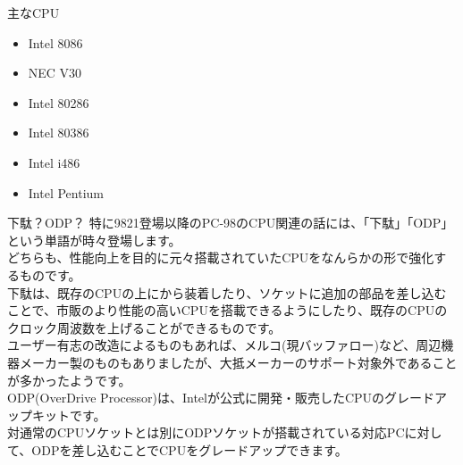 \documentclass[b5paper,9pt,platex,dvipdfmx]{jsarticle}
\begin{document}
\begin{multicols}{3}
\begin{enumerate}
\begin{itembox}[l]{主なCPU}
  \begin{itemize}
    \item Intel 8086
    \item NEC V30
    \item Intel 80286
    \item Intel 80386
    \item Intel i486
    \item Intel Pentium
  \end{itemize}
\end{itembox}
\begin{itembox}[l]{下駄？ODP？}
特に9821登場以降のPC-98のCPU関連の話には、「下駄」「ODP」という単語が時々登場します。\\
どちらも、性能向上を目的に元々搭載されていたCPUをなんらかの形で強化するものです。\\
下駄は、既存のCPUの上にから装着したり、ソケットに追加の部品を差し込むことで、市販のより性能の高いCPUを搭載できるようにしたり、既存のCPUのクロック周波数を上げることができるものです。\\
ユーザー有志の改造によるものもあれば、メルコ(現バッファロー)など、周辺機器メーカー製のものもありましたが、大抵メーカーのサポート対象外であることが多かったようです。\\
ODP(OverDrive Processor)は、Intelが公式に開発・販売したCPUのグレードアップキットです。\\
対通常のCPUソケットとは別にODPソケットが搭載されている対応PCに対して、ODPを差し込むことでCPUをグレードアップできます。\\
\end{itembox}


\end{enumerate}
\end{multicols}
\end{document}
